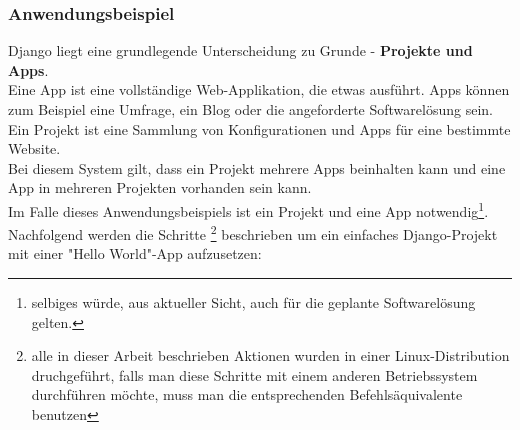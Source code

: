 \documentclass[letterpaper,11pt,leqno]{article}
\begin{document}
\subsubsection{Anwendungsbeispiel}
Django liegt eine grundlegende Unterscheidung zu Grunde - \textbf{Projekte und Apps}.\\Eine App ist
eine vollständige Web-Applikation, die etwas ausführt. Apps können zum Beispiel eine Umfrage, ein
Blog oder die angeforderte Softwarelösung sein.\\Ein Projekt ist eine Sammlung von Konfigurationen
und Apps für eine bestimmte Website.\\Bei diesem System gilt, dass ein Projekt mehrere Apps
beinhalten kann und eine App in mehreren Projekten vorhanden sein kann.\\Im Falle dieses
Anwendungsbeispiels ist ein Projekt und eine App notwendig\footnote{selbiges würde, aus aktueller
Sicht, auch für die geplante Softwarelösung gelten.}.\\Nachfolgend werden die Schritte
\footnote{alle in dieser Arbeit beschrieben Aktionen wurden in einer Linux-Distribution
druchgeführt, falls man diese Schritte mit einem anderen Betriebssystem durchführen möchte, muss man
die entsprechenden Befehlsäquivalente benutzen} beschrieben um ein einfaches Django-Projekt mit
einer "Hello World"-App aufzusetzen:
\end{document}
